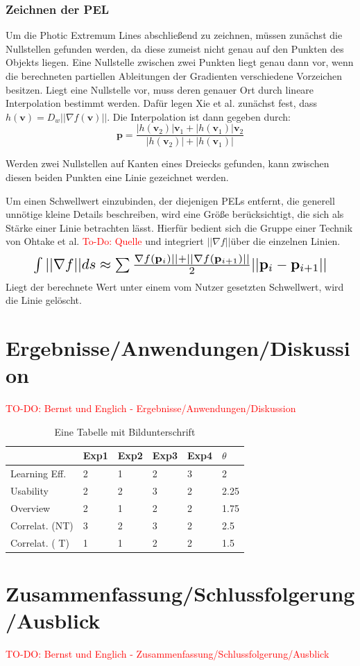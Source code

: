\documentclass{paperStyle}
\newcommand\todo[1]{\textcolor{red}{#1}}
\begin{document}
\subsubsection{Zeichnen der PEL}
\label{zeichnen}
Um die Photic Extremum Lines abschließend zu zeichnen, müssen zunächst die Nullstellen gefunden werden, da diese zumeist nicht genau auf den Punkten des Objekts liegen. Eine Nullstelle zwischen zwei Punkten liegt genau dann vor, wenn die berechneten partiellen Ableitungen der Gradienten verschiedene Vorzeichen besitzen. Liegt eine Nullstelle vor, muss deren genauer Ort durch lineare Interpolation bestimmt werden. Dafür legen Xie et al. zunächst fest, dass $h(\mathbf{v}) = D_{w}|| \nabla f(\mathbf{v})||$. Die Interpolation ist dann gegeben durch:
\begin{equation}
\mathbf{p} = \frac{|h(\mathbf{v}_{2})|\mathbf{v}_{1}+|h(\mathbf{v}_{1})|\mathbf{v}_{2}}{|h(\mathbf{v}_{2})|+|h(\mathbf{v}_{1})|}
\end{equation}

Werden zwei Nullstellen auf Kanten eines Dreiecks gefunden, kann zwischen diesen beiden Punkten eine Linie gezeichnet werden.

Um einen Schwellwert einzubinden, der diejenigen PELs entfernt, die generell unnötige kleine Details beschreiben, wird eine Größe berücksichtigt, die sich als Stärke einer Linie betrachten lässt. Hierfür bedient sich die Gruppe einer Technik von Ohtake et al. \todo{To-Do: Quelle} und integriert $|| \nabla f ||$über die einzelnen Linien. 
\begin{equation}
\resizebox{.88\hsize}{!}{$\int{} || \nabla f ||ds \approx \sum \frac{ \nabla f(\mathbf{p}_{i})|| + || \nabla f(\mathbf{p}_{i+1})||}{2}||\mathbf{p}_{i} - \mathbf{p}_{i+1}||$}
\end{equation}
Liegt der berechnete Wert unter einem vom Nutzer gesetzten Schwellwert, wird die Linie gelöscht.
\section{Ergebnisse/Anwendungen/Diskussion}
\todo{TO-DO: Bernst und Englich - Ergebnisse/Anwendungen/Diskussion}

\begin{table}[htb]

\begin{tabular}{|l|lllll|}
\hline
 & Exp1 & Exp2 & Exp3 & Exp4 &$\theta$\\
\hline
Learning Eff. & 2 & 1 & 2 &3 & 2 \\
Usability & 2 & 2 & 3 &2 & 2.25 \\
Overview & 2 & 1 & 2 &2 & 1.75 \\
Correlat. (NT) & 3 & 2 & 3 &2 & 2.5 \\
Correlat. ( T) & 1 & 1 & 2 &2 & 1.5 \\

\hline
\end{tabular}
\caption{Eine Tabelle mit Bildunterschrift }
\label{tab:TableExample}
\end{table}

\section{Zusammenfassung/Schlussfolgerung/Ausblick}
\todo{TO-DO: Bernst und Englich - Zusammenfassung/Schlussfolgerung/Ausblick}




\end{document}
